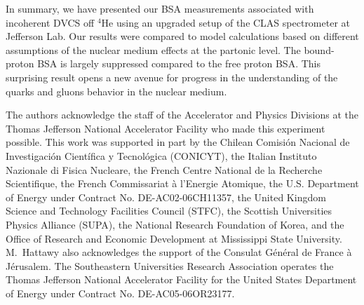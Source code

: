 \documentclass[twocolumn,nofootinbib,showpacs,prl,superscriptaddress,secnumarabic,amssymb,nobibnotes,aps,floatfix]{revtex4}
\begin{document}
In summary, we have presented our BSA measurements 
associated with incoherent DVCS off $^4$He using an upgraded setup of the CLAS 
spectrometer at Jefferson Lab. Our results were compared to model 
calculations based on different assumptions of the nuclear medium effects at 
the partonic level. The bound-proton BSA is largely suppressed compared to 
the free proton BSA. This surprising result opens a new avenue 
for progress in the understanding of the quarks and gluons behavior in the
nuclear medium.


The authors acknowledge the staff of the Accelerator and Physics Divisions at 
the Thomas Jefferson National Accelerator Facility who made this experiment 
possible. This work was supported in part by the Chilean Comisi\'on Nacional de 
Investigaci\'on Cient\'ifica y Tecnol\'ogica (CONICYT), the Italian Instituto 
Nazionale di Fisica Nucleare, the French Centre National de la Recherche 
Scientifique, the French Commissariat \`a l'Energie Atomique, the U.S.  
Department of Energy under Contract No. DE-AC02-06CH11357, the United Kingdom 
Science and Technology Facilities Council (STFC), the Scottish Universities 
Physics Alliance (SUPA), the National Research Foundation of Korea, and the 
Office of Research and Economic Development at Mississippi State University.  
M.~Hattawy also acknowledges the support of the Consulat G\'en\'eral de France 
\`a J\'erusalem.  The Southeastern Universities Research Association operates 
the Thomas Jefferson National Accelerator Facility for the United States 
Department of Energy under Contract No. DE-AC05-06OR23177.
\end{document}
